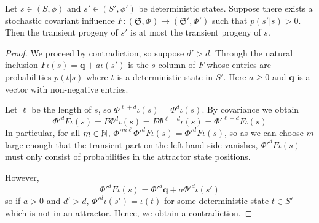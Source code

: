 \begin{lem}[label=lem:stochProgeny]
    Let $s \in (S,\phi)$ and $s' \in (S',\phi')$ be deterministic states. Suppose there exists a stochastic covariant influence $F:(\mathfrak{S},\Phi)\rightarrow (\mathfrak{S}',\Phi')$ such that $p(s'|s) > 0$. Then the transient progeny of $s'$ is at most the transient progeny of $s$.
\end{lem}
\begin{proof}
    We proceed by contradiction, so suppose $d' > d$. Through the natural inclusion $F\iota(s) = \mathbf{q}+a\iota(s')$ is the $s$ column of $F$ whose entries are probabilities $p(t|s)$ where $t$ is a deterministic state in $S'$. Here $a \geq 0$ and $\mathbf{q}$ is a vector with non-negative entries. 
    
    
    Let $\ell$ be the length of $s$, so $\Phi^{\ell+d}\iota(s) = \Phi^d\iota(s)$. By covariance we obtain 
    \begin{equation*}           
        {\Phi'}^dF\iota(s) = F\Phi^d\iota(s) = F\Phi^{\ell+d}\iota(s) = {\Phi'}^{\ell+d}F\iota(s)
    \end{equation*}
    In particular, for all $m \in \mathbb N$, ${\Phi'}^{m\ell}{\Phi'}^dF\iota(s) = {\Phi'}^dF\iota(s)$, so as we can choose $m$ large enough that the transient part on the left-hand side vanishes, ${\Phi'}^dF\iota(s)$ must only consist of probabilities in the attractor state positions.


    However, 
    \begin{equation*}
        {\Phi'}^dF\iota(s) = {\Phi'}^d\mathbf{q}+a{\Phi'}^d\iota(s')
    \end{equation*}
    so if $a > 0$ and $d' > d$, ${\Phi'}^d\iota(s') = \iota(t)$ for some deterministic state $t \in S'$ which is not in an attractor. Hence, we obtain a contradiction. 
\end{proof}


